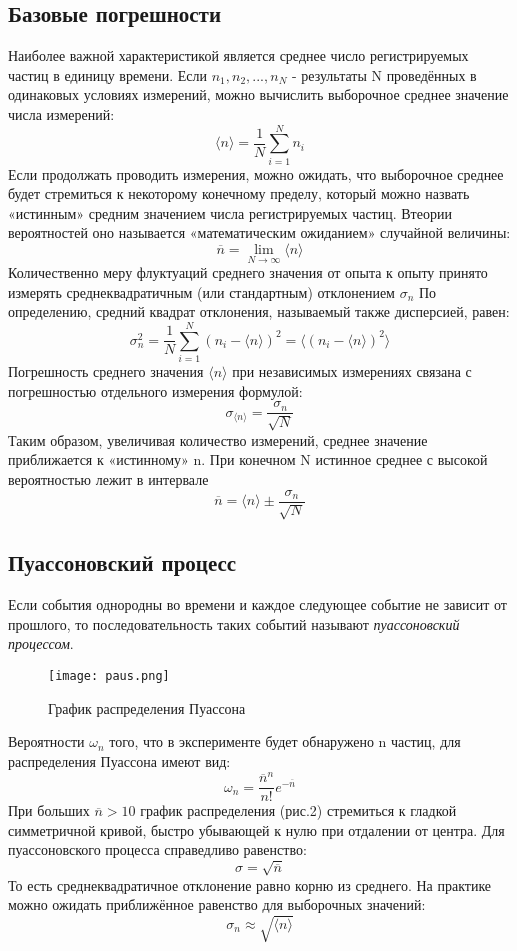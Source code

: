 \documentclass[a4paper]{article}
\begin{document}
\subsection{Базовые погрешности}
Наиболее важной характеристикой является среднее число регистрируемых частиц в единицу времени. Если $n_{1}, n_{2}, ..., n_{N}$ - результаты N проведённых в одинаковых условиях измерений, можно вычислить выборочное среднее значение числа измерений:
\[\langle n \rangle = \frac{1}{N}\sum\limits_{i=1}^{N} n_{i}\]
Если продолжать проводить измерения, можно ожидать, что выборочное среднее будет стремиться к некоторому конечному пределу, который можно назвать «истинным» средним значением числа регистрируемых частиц. Втеории вероятностей оно называется «математическим ожиданием» случайной величины:
\[\overline{n} = \lim_{N \to \infty} \langle n \rangle\]
Количественно меру флуктуаций среднего значения от опыта к опыту принято измерять среднеквадратичным (или стандартным) отклонением $\sigma_{n}$
По определению, средний квадрат отклонения, называемый также дисперсией, равен:
\[\sigma_{n}^2 = \frac{1}{N}\sum\limits_{i=1}^{N} (n_{i} - \langle n \rangle)^2 = \langle (n_{i} - \langle n \rangle)^2 \rangle\]
Погрешность среднего значения $\langle n \rangle$ при независимых измерениях связана с погрешностью отдельного измерения формулой:
\[\sigma_{\langle n \rangle} = \frac{\sigma_{n}}{\sqrt{N}}\]
Таким образом, увеличивая количество измерений, среднее значение приближается к «истинному» n. При конечном N истинное среднее с высокой вероятностью лежит в интервале 
\[\overline{n} = \langle n \rangle \pm \frac{\sigma_{n}}{\sqrt{N}}\]

\subsection{Пуассоновский процесс}
Если события однородны во времени и каждое следующее событие не зависит от прошлого, то последовательность таких событий называют \textit{пуассоновский процессом}.\newline

\begin{figure}[t]
    \centering
    \texttt{[image: paus.png]}
    \caption{График распределения Пуассона}
\end{figure}

Вероятности $\omega_{n}$ того, что в эксперименте будет обнаружено n частиц, для распределения Пуассона имеют вид:
\[\omega_{n} =  \frac{\overline{n}^{n}}{n!} e^{-\overline{n}}\]
\newline
При больших $\overline{n} > 10$ график распределения (рис.2) стремиться к гладкой симметричной кривой, быстро убывающей к нулю при отдалении от центра.
\newline
Для пуассоновского процесса справедливо равенство:
\[\sigma = \sqrt{\overline{n}}\]
То есть среднеквадратичное отклонение равно корню из среднего. На практике можно ожидать приближённое равенство для выборочных значений:
\[\sigma_{n} \approx \sqrt{\langle n \rangle}\]
\end{document}

